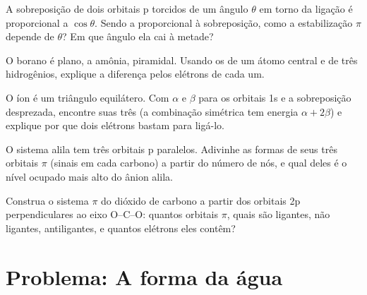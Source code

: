 \begin{exercise}[$\star\star$]\label{exo:b2:fragment-orbitals:8}
A sobreposição de dois orbitais p torcidos de um ângulo $\theta$ em torno da
ligação é proporcional a $\cos\theta$. Sendo a 
proporcional à sobreposição, como a estabilização $\pi$ depende de $\theta$? Em
que ângulo ela cai à metade?
\end{exercise}

\begin{exercise}[$\star\star$]\label{exo:b2:fragment-orbitals:9}
O borano  é plano, a amônia, piramidal. Usando os 
de um átomo central e de três hidrogênios, explique a diferença pelos elétrons
de cada um.
\end{exercise}

\begin{exercise}[$\star\star\star$]\label{exo:b2:fragment-orbitals:10}
O íon  é um triângulo equilátero. Com $\alpha$ e $\beta$ para os orbitais
1s e a sobreposição desprezada, encontre suas três  (a
combinação simétrica tem energia $\alpha + 2\beta$) e explique por que dois
elétrons bastam para ligá-lo.
\end{exercise}

\begin{exercise}[$\star\star\star$]\label{exo:b2:fragment-orbitals:11}
O sistema alila  tem três orbitais p paralelos. Adivinhe as
formas de seus três orbitais $\pi$ (sinais em cada carbono) a partir do número
de nós, e qual deles é o nível ocupado mais alto do ânion alila.
\end{exercise}

\begin{exercise}[$\star\star\star$]\label{exo:b2:fragment-orbitals:12}
Construa o sistema $\pi$ do dióxido de carbono a partir dos orbitais 2p
perpendiculares ao eixo O--C--O: quantos orbitais $\pi$, quais são ligantes,
não ligantes, antiligantes, e quantos elétrons eles contêm?
\end{exercise}

\section{Problema: A forma da água}

